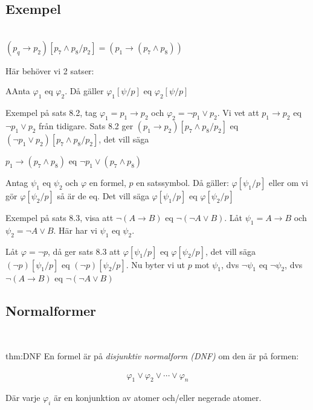 \subsection{Exempel}\hfill\\

\noindent $(p_q\rightarrow p_2)[p_7\wedge p_8/p_2]=(p_1\rightarrow(p_7\wedge p_8))$
\par\bigskip
\noindent Här behöver vi 2 satser:
\par\bigskip

\begin{theo}
  AAnta $\varphi_1$ eq $\varphi_2$. Då gäller $\varphi_1[\psi/p]$ eq $\varphi_2[\psi/p]$
\end{theo}
\par\bigskip
\noindent Exempel på sats 8.2, tag $\varphi_1=p_1\rightarrow p_2$ och $\varphi_2 = \neg p_1\vee p_2$. Vi vet att $p_1\rightarrow p_2$ eq $\neg p_1\vee p_2$ från tidigare. Sats 8.2 ger $(p_1\rightarrow p_2)[p_7\wedge p_8/p_2]$ eq $(\neg p_1 \vee p_2)[p_7\wedge p_8/p_2]$, det vill säga\par\noindent $p_1\rightarrow(p_7\wedge p_8)$ eq $\neg p_1\vee(p_7\wedge p_8)$
\par\bigskip
\begin{theo}
  Antag $\psi_1$ eq $\psi_2$ och $\varphi$ en formel, $p$ en satssymbol. Då gäller: $\varphi[\psi_1/p]$ eller om vi gör $\varphi[\psi_2/p]$ så är de eq. Det vill säga $\varphi[\psi_1/p]$ eq $\varphi[\psi_2/p]$
\end{theo}
\par\bigskip
\noindent Exempel på sats 8.3, visa att $\neg(A\rightarrow B)$ eq $\neg(\neg A\vee B)$. Låt $\psi_1=A\rightarrow B$ och $\psi_2 = \neg A\vee B$. Här har vi $\psi_1$ eq $\psi_2$.\par\noindent Låt $\varphi = \neg p$, då ger sats 8.3 att $\varphi[\psi_1/p]$ eq $\varphi[\psi_2/p]$, det vill säga $(\neg p)[\psi_1/p]$ eq $(\neg p)[\psi_2/p]$. Nu byter vi ut $p$ mot $\psi_1$, dvs $\neg\psi_1$ eq $\neg\psi_2$, dvs $\neg(A\rightarrow B)$ eq $\neg(\neg A\vee B)$ 
\pagebreak
\subsection{Normalformer}\hfill\\

\begin{theo}[DNF]{thm:DNF}
  En formel är på \textit{disjunktiv normalform (DNF)} om den är på formen:

  \begin{equation*}
    \begin{gathered}
      \varphi_1\vee\varphi_2\vee\cdots\vee\varphi_n
    \end{gathered}
  \end{equation*}

  \noindent Där varje $\varphi_i$ är en konjunktion av atomer och/eller negerade atomer.
\end{theo}
\par\bigskip

